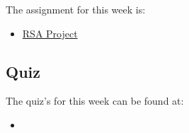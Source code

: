 The assignment for this week is:

\begin{itemize}
    \item \href{https://github.com/QuantumCompiler/CU/tree/main/CSPB%202824%20-%20Discrete%20Structures/CSPB%202824%20-%20RSA%20Project}{RSA Project}
\end{itemize}

\subsection{Quiz}

The quiz's for this week can be found at:

\begin{itemize}
    \item {}
\end{itemize}